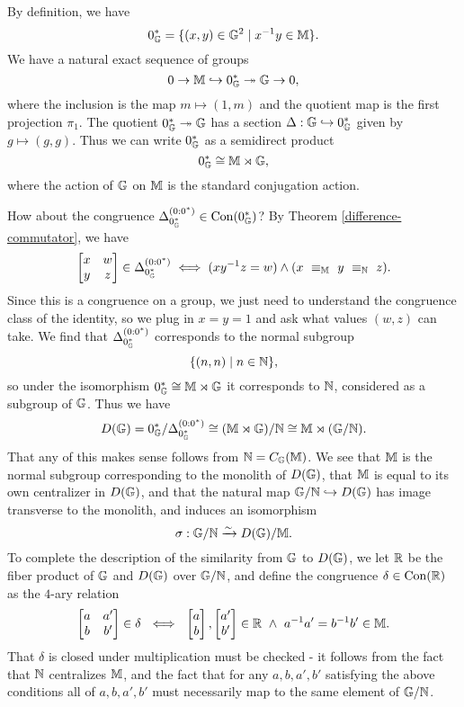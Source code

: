 \begin{appendices}
\begin{ex}
By definition, we have
\[
0_{\mathbb{G}}^* = \{(x,y) \in \mathbb{G}^2 \mid x^{-1}y \in \mathbb{M}\}.
\]
We have a natural exact sequence of groups
\[
0 \rightarrow \mathbb{M} \hookrightarrow 0_{\mathbb{G}}^* \twoheadrightarrow \mathbb{G} \rightarrow 0,
\]
where the inclusion is the map $m \mapsto (1,m)$ and the quotient map is the first projection $\pi_1$. The quotient $0_{\mathbb{G}}^* \twoheadrightarrow \mathbb{G}$ has a section $\Delta : \mathbb{G} \hookrightarrow 0_{\mathbb{G}}^*$ given by $g \mapsto (g,g)$. Thus we can write $0_{\mathbb{G}}^*$ as a semidirect product
\[
0_{\mathbb{G}}^* \cong \mathbb{M} \rtimes \mathbb{G},
\]
where the action of $\mathbb{G}$ on $\mathbb{M}$ is the standard conjugation action.

How about the congruence $\Delta_{0_{\mathbb{G}}^*}^{(0:0^*)} \in \operatorname{Con}(0_{\mathbb{G}}^*)$? By Theorem \ref{difference-commutator}, we have
\[
\begin{bmatrix} x & w\\ y & z\end{bmatrix} \in \Delta_{0_{\mathbb{G}}^*}^{(0:0^*)} \iff (xy^{-1}z = w) \wedge (x\ \equiv_{\mathbb{M}}\ y\ \equiv_{\mathbb{N}}\ z).
\]
Since this is a congruence on a group, we just need to understand the congruence class of the identity, so we plug in $x = y = 1$ and ask what values $(w,z)$ can take. We find that $\Delta_{0_{\mathbb{G}}^*}^{(0:0^*)}$ corresponds to the normal subgroup
\[
\{(n,n) \mid n \in \mathbb{N}\},
\]
so under the isomorphism $0_{\mathbb{G}}^* \cong \mathbb{M} \rtimes \mathbb{G}$ it corresponds to $\mathbb{N}$, considered as a subgroup of $\mathbb{G}$. Thus we have
\[
D(\mathbb{G}) = 0_{\mathbb{G}}^*/\Delta_{0_{\mathbb{G}}^*}^{(0:0^*)} \cong (\mathbb{M} \rtimes \mathbb{G})/\mathbb{N} \cong \mathbb{M} \rtimes (\mathbb{G}/\mathbb{N}).
\]
That any of this makes sense follows from $\mathbb{N} = C_{\mathbb{G}}(\mathbb{M})$. We see that $\mathbb{M}$ is the normal subgroup corresponding to the monolith of $D(\mathbb{G})$, that $\mathbb{M}$ is equal to its own centralizer in $D(\mathbb{G})$, and that the natural map $\mathbb{G}/\mathbb{N} \hookrightarrow D(\mathbb{G})$ has image transverse to the monolith, and induces an isomorphism
\[
\sigma : \mathbb{G}/\mathbb{N} \xrightarrow{\sim} D(\mathbb{G})/\mathbb{M}.
\]
To complete the description of the similarity from $\mathbb{G}$ to $D(\mathbb{G})$, we let $\mathbb{R}$ be the fiber product of $\mathbb{G}$ and $D(\mathbb{G})$ over $\mathbb{G}/\mathbb{N}$, and define the congruence $\delta \in \operatorname{Con}(\mathbb{R})$ as the $4$-ary relation
\[
\begin{bmatrix} a & a'\\ b & b'\end{bmatrix} \in \delta\ \iff\ \begin{bmatrix} a\\ b \end{bmatrix}, \begin{bmatrix} a'\\ b'\end{bmatrix} \in \RR\ \wedge\ a^{-1}a' = b^{-1}b' \in \bM.
\]
That $\delta$ is closed under multiplication must be checked - it follows from the fact that $\mathbb{N}$ centralizes $\mathbb{M}$, and the fact that for any $a,b,a',b'$ satisfying the above conditions all of $a,b,a',b'$ must necessarily map to the same element of $\mathbb{G}/\mathbb{N}$.


\end{ex}
\end{appendices}
